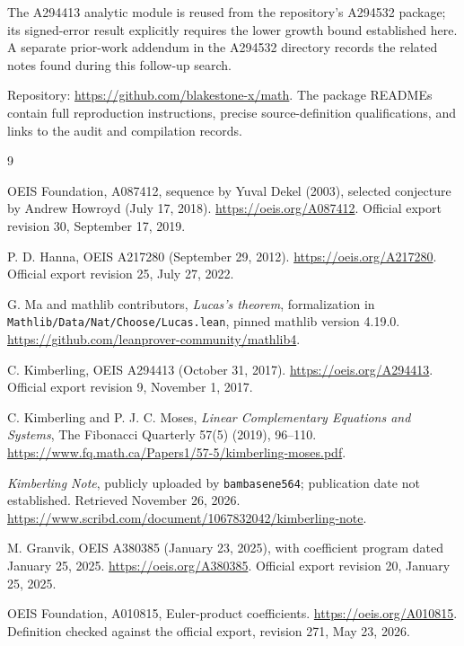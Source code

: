 \documentclass[11pt]{article}
\begin{document}
The A294413 analytic module is reused from the repository's A294532
package; its signed-error result explicitly requires the lower growth
bound established here. A separate prior-work addendum in the A294532
directory records the related notes found during this follow-up search.

Repository: \url{https://github.com/blakestone-x/math}. The package
READMEs contain full reproduction instructions, precise source-definition
qualifications, and links to the audit and compilation records.

\begin{thebibliography}{9}
\raggedright
{}
OEIS Foundation, A087412, sequence by Yuval Dekel (2003), selected
conjecture by Andrew Howroyd (July 17, 2018).
\url{https://oeis.org/A087412}. Official export revision 30,
September 17, 2019.

P. D. Hanna, OEIS A217280 (September 29, 2012).
\url{https://oeis.org/A217280}. Official export revision 25,
July 27, 2022.

G. Ma and mathlib contributors, \emph{Lucas's theorem}, formalization in
\texttt{Mathlib/Data/Nat/Choose/Lucas.lean}, pinned mathlib version 4.19.0.
\url{https://github.com/leanprover-community/mathlib4}.

C. Kimberling, OEIS A294413 (October 31, 2017).
\url{https://oeis.org/A294413}. Official export revision 9,
November 1, 2017.

C. Kimberling and P. J. C. Moses, \emph{Linear Complementary Equations and
Systems}, The Fibonacci Quarterly 57(5) (2019), 96--110.
\url{https://www.fq.math.ca/Papers1/57-5/kimberling-moses.pdf}.

\emph{Kimberling Note}, publicly uploaded by \texttt{bambasene564};
publication date not established. Retrieved November 26, 2026.
\url{https://www.scribd.com/document/1067832042/kimberling-note}.

M. Granvik, OEIS A380385 (January 23, 2025), with coefficient program
dated January 25, 2025. \url{https://oeis.org/A380385}.
Official export revision 20, January 25, 2025.

OEIS Foundation, A010815, Euler-product coefficients.
\url{https://oeis.org/A010815}. Definition checked against the official
export, revision 271, May 23, 2026.
\end{thebibliography}
\end{document}
